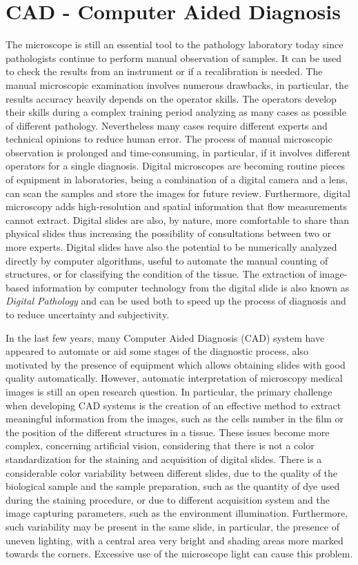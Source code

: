 \documentclass[final,a4paper,12pt,english]{UnicaPhdThesis3}
\begin{document}
\section{CAD - Computer Aided Diagnosis}
The microscope is still an essential tool to the pathology laboratory today since pathologists continue to perform manual observation of samples. It can be used to check the results from an instrument or if a recalibration is needed. The manual microscopic examination involves numerous drawbacks, in particular, the results accuracy heavily depends on the operator skills. The operators develop their skills during a complex training period analyzing as many cases as possible of different pathology. Nevertheless many cases require different experts and technical opinions to reduce human error. The process of manual microscopic observation is prolonged and time-consuming, in particular, if it involves different operators for a single diagnosis. Digital microscopes are becoming routine pieces of equipment in laboratories, being a combination of a digital camera and a lens, can scan the samples and store the images for future review.
Furthermore, digital microscopy adds high-resolution and spatial information that flow measurements cannot extract. Digital slides are also, by nature, more comfortable to share than physical slides thus increasing the possibility of consultations between two or more experts. Digital slides have also the potential to be numerically analyzed directly by computer algorithms, useful to automate the manual counting of structures, or for classifying the condition of the tissue. The extraction of image-based information by computer technology from the digital slide is also known as \textit{Digital Pathology} and can be used both to speed up the process of diagnosis and to reduce uncertainty and subjectivity.

In the last few years, many Computer Aided Diagnosis (\acs{CAD}) system have appeared to automate or aid some stages of the diagnostic process, also motivated by the presence of equipment which allows obtaining slides with good quality automatically. However, automatic interpretation of microscopy medical images is still an open research question. In particular, the primary challenge when developing CAD systems is the creation of an effective method to extract meaningful information from the images, such as the cells number in the film or the position of the different structures in a tissue. These issues become more complex, concerning artificial vision, considering that there is not a color standardization for the staining and acquisition of digital slides. There is a considerable color variability between different slides, due to the quality of the biological sample and the sample preparation, such as the quantity of dye used during the staining procedure, or due to different acquisition system and the image capturing parameters, such as the environment illumination. Furthermore, such variability may be present in the same slide, in particular, the presence of uneven lighting, with a central area very bright and shading areas more marked towards the corners.  Excessive use of the microscope light can cause this problem.
\end{document}
